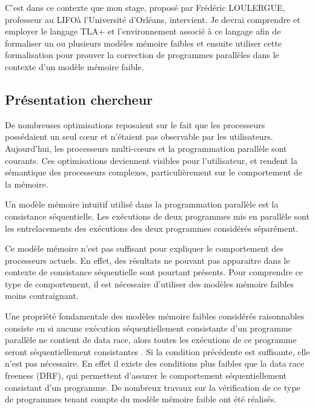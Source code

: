 \documentclass[12pt,a4paper]{article}
\begin{document}
C'est dans ce contexte que mon stage, proposé par Frédéric LOULERGUE, professeur au LIFO\footnotemark[1] à l'Université d'Orléans, intervient. Je devrai comprendre et employer le langage TLA+ \cite{Lamport:2002:SST:579617} et l'environnement associé à ce langage afin de formaliser un ou plusieurs modèles mémoire faibles et ensuite utiliser cette formalisation pour prouver la correction de programmes parallèles dans le contexte d'un modèle mémoire faible. 

\subsection{Présentation chercheur}
De nombreuses optimisations reposaient sur le fait que les processeurs possédaient un seul cœur et n'étaient pas observable par les utilisateurs.
Aujourd'hui, les processeurs multi-cœurs et la programmation parallèle sont courants. Ces optimisations deviennent visibles pour l'utilisateur, et rendent la sémantique des processeurs complexes, particulièrement sur le comportement de la mémoire.

Un modèle mémoire intuitif utilisé dans la programmation parallèle est la consistance séquentielle. Les exécutions de deux programmes mis en parallèle sont les entrelacements des exécutions des deux programmes considérés séparément.
 
Ce modèle mémoire n'est pas suffisant pour expliquer le comportement des processeurs actuels. En effet, des résultats ne pouvant pas apparaitre dans le contexte de consistance séquentielle sont pourtant présents. Pour comprendre ce type de comportement, il est nécessaire d'utiliser des modèles mémoire faibles \cite{Adve:1996:SMC:619013.620590} moins contraignant. 

Une propriété fondamentale des modèles mémoire faibles considérés raisonnables consiste en si aucune exécution séquentiellement consistante d'un programme parallèle ne contient de data race, alors toutes les exécutions de ce programme seront séquentiellement consistantes \cite{Saraswat:2007:TMM:1229428.1229469}.
Si la condition précédente est suffisante, elle n'est pas nécessaire. En effet il existe des conditions plus faibles que la data race freeness (DRF), qui permettent d'assurer le comportement séquentiellement consistant d'un programme\cite{Owens:2010:RIC:1883978.1884011}. De nombreux travaux sur la vérification de ce type de programmes tenant compte du modèle mémoire faible ont été réalisés\cite{Turon:2014:GNW:2714064.2660243}.
\end{document}
